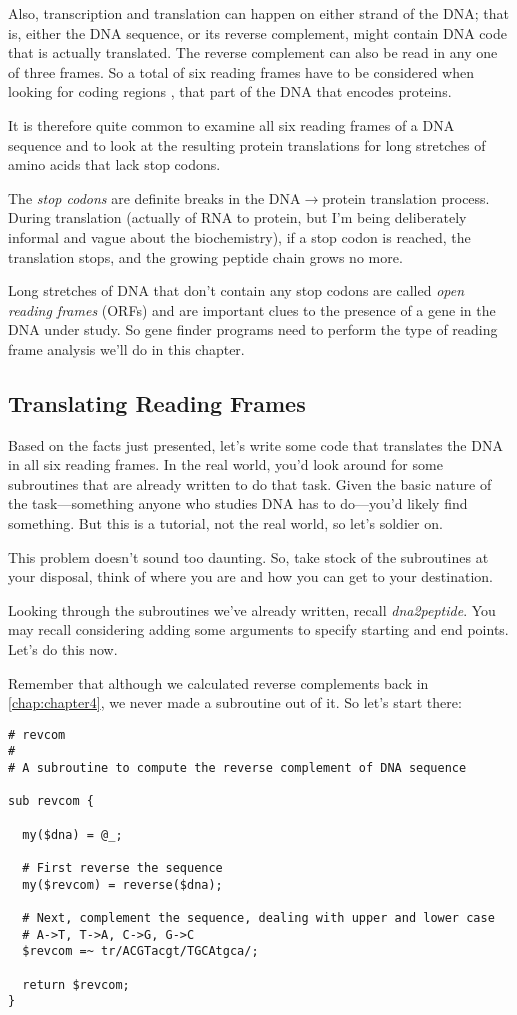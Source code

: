 Also, transcription and translation can happen on either strand of the DNA; that is, either the DNA sequence, or its reverse complement, might contain DNA code that is actually translated. The reverse complement can also be read in any one of three frames. So a total of six reading frames have to be considered when looking for coding regions , that part of the DNA that encodes proteins.

It is therefore quite common to examine all six reading frames of a DNA sequence and to look at the resulting protein translations for long stretches of amino acids that lack stop codons.

The \textit{stop codons} are definite breaks in the DNA$\rightarrow$protein translation process. During translation (actually of RNA to protein, but I'm being deliberately informal and vague about the biochemistry), if a stop codon is reached, the translation stops, and the growing peptide chain grows no more.

Long stretches of DNA that don't contain any stop codons are called \textit{open reading frames} (ORFs) and are important clues to the presence of a gene in the DNA under study. So gene finder programs need to perform the type of reading frame analysis we'll do in this chapter. 

\subsection{Translating Reading Frames}
Based on the facts just presented, let's write some code that translates the DNA in all six reading frames.  
In the real world, you'd look around for some subroutines that are already written to do that task. Given the basic nature of the task—something anyone who studies DNA has to do—you'd likely find something. But this is a tutorial, not the real world, so let's soldier on.

This problem doesn't sound too daunting. So, take stock of the subroutines at your disposal, think of where you are and how you can get to your destination.

Looking through the subroutines we've already written, recall \textit{dna2peptide}. You may recall considering adding some arguments to specify starting and end points. Let's do this now.

Remember that although we calculated reverse complements back in \autoref{chap:chapter4}, we never made a subroutine out of it. So let's start there: 

\begin{lstlisting}
# revcom 
#
# A subroutine to compute the reverse complement of DNA sequence

sub revcom {

  my($dna) = @_;

  # First reverse the sequence
  my($revcom) = reverse($dna);

  # Next, complement the sequence, dealing with upper and lower case
  # A->T, T->A, C->G, G->C
  $revcom =~ tr/ACGTacgt/TGCAtgca/;

  return $revcom;
}
\end{lstlisting}

